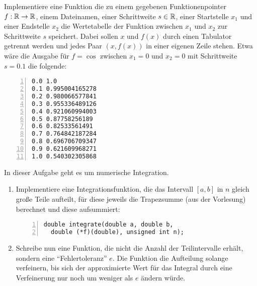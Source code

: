 \documentclass{uebungszettel}
\begin{document}
\newcommand{\ah}[2]{\ \\* \emph{(#1, #2)}\\}
\newcommand{\power}{\mathrm{power}}




\begin{aufg} Implementiere eine Funktion die zu einem gegebenen Funktionenpointer $f:\mathbb{R} \rightarrow \mathbb{R}$, einem Dateinamen, einer Schrittweite $s \in \mathbb{R}$, einer Startstelle $x_1$ und einer Endstelle $x_2$ die Wertetabelle der Funktion zwischen $x_1$ und $x_2$ zur Schrittweite $s$ speichert. Dabei sollen $x$ und $f(x)$ durch einen Tabulator getrennt werden und jedes Paar $(x, f(x))$ in einer eigenen Zeile stehen. Etwa wäre die Ausgabe für $f=\cos$ zwischen $x_1=0$ und $x_2=0$ mit Schrittweite $s=0.1$ die folgende:
\begin{codelisting}
\begin{lstlisting}[numbers=left,numberstyle=\tiny,frame=tlrb]
0.0 1.0
0.1 0.995004165278
0.2 0.980066577841
0.3 0.955336489126
0.4 0.921060994003
0.5 0.87758256189
0.6 0.82533561491
0.7 0.764842187284
0.8 0.696706709347
0.9 0.621609968271
1.0 0.540302305868
\end{lstlisting}
\end{codelisting}
\end{aufg}

\begin{aufg}
In dieser Aufgabe geht es um numerische Integration.
\begin{enumerate}
\item Implementiere eine Integrationsfunktion, die das Intervall $[a, b]$ in $n$ gleich große Teile aufteilt, für diese jeweils die Trapezsumme (aus der Vorlesung) berechnet und diese aufsummiert:

\begin{codelisting}
\begin{lstlisting}[numbers=left,numberstyle=\tiny,frame=tlrb]
double integrate(double a, double b, 
  double (*f)(double), unsigned int n); 
\end{lstlisting}
\end{codelisting}

\item Schreibe nun eine Funktion, die nicht die Anzahl der Teilintervalle erhält, sondern eine ``Fehlertoleranz'' $e$. Die Funktion die Aufteilung solange verfeinern, bis sich der approximierte Wert für das Integral durch eine Verfeinerung nur noch um weniger als $e$ ändern würde. 
\end{enumerate}
\end{aufg}
\end{document}
